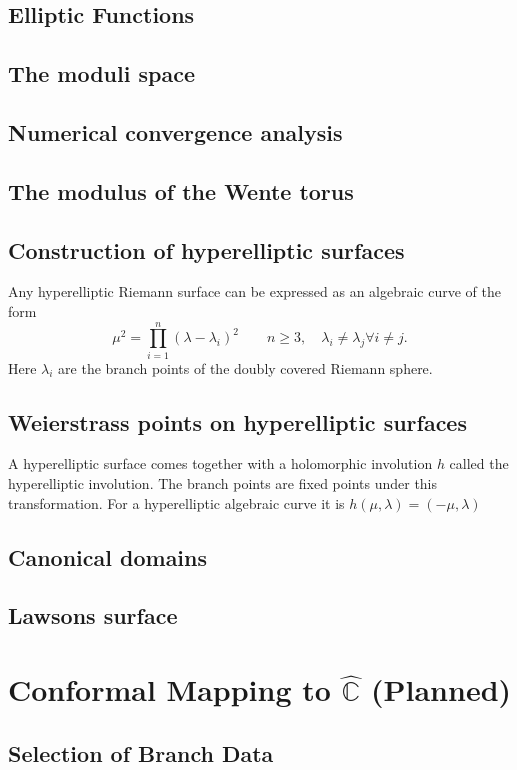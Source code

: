 \documentclass{book}
\begin{document}
\subsection{Elliptic Functions}
\subsection{The moduli space}
\subsection{Numerical convergence analysis}
\subsection{The modulus of the Wente torus}

\subsection{Construction of hyperelliptic surfaces}
Any hyperelliptic Riemann surface can be expressed as an algebraic curve of the form
\[ \mu^2 = \prod_{i=1}^n(\lambda-\lambda_i)^2 \quad\quad n\geq3,\quad \lambda_i\neq \lambda_j \forall i\neq j.\]
Here $\lambda_i$ are the branch points of the doubly covered Riemann sphere.

\subsection{Weierstrass points on hyperelliptic surfaces}
A hyperelliptic surface comes together with a holomorphic involution $h$ called the hyperelliptic involution. The branch points are fixed points under this transformation. For a hyperelliptic algebraic curve it is $h(\mu, \lambda)=(-\mu, \lambda)$

\subsection{Canonical domains}
\subsection{Lawsons surface}


\section{Conformal Mapping to $\hat{\mathbb{C}}$ (Planned)}
\subsection{Selection of Branch Data}
\end{document}
